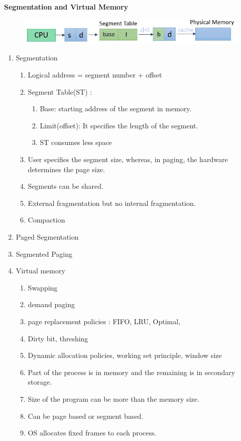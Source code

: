 
\centerline{\textbf{ \LARGE Segmentation and Virtual Memory}}




  \begin{figure}[h]
      \centering   \includegraphics[scale=2.5]{./images/segmentation_01.jpeg}
  \end{figure}

\begin{enumerate}

  \item Segmentation
  \begin{enumerate}
    \item Logical address = segment number + offset
    \item Segment Table(ST) :
    \begin{enumerate}
      \item Base: starting address of the segment in memory.
      \item Limit(offset): It specifies the length of the segment.
      \item ST consumes less space
    \end{enumerate}
  \item User specifies the segment size, whereas, in paging, the hardware determines the page size.
  \item Segments can be shared.
  \item External fragmentation but no internal fragmentation.
  \item Compaction
  \end{enumerate}

  \item Paged Segmentation
  \item Segmented Paging
  \item Virtual memory
    \begin{enumerate}
    \item Swapping
    \item demand paging
    \item page replacement policies : FIFO, LRU, Optimal,
    \item Dirty bit, threshing
    \item Dynamic allocation policies, working set principle, window size
    \item Part of the process is in memory and the remaining is in secondary storage.
    \item Size of the program can be more than the memory size.
    \item Can be page based or segment based.
    \item OS allocates fixed frames to each process.
  \end{enumerate}

\end{enumerate}


